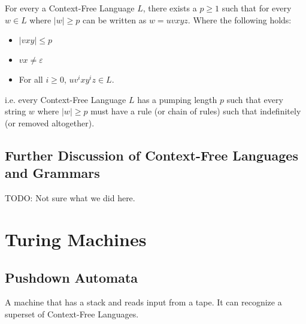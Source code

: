         For every a Context-Free Language $L$, there exists a $p \ge 1$ such
        that for every $w \in L$ where $|w| \ge p$ can be written as
        $w = uvxyz$.
        Where the following holds:
        \begin{itemize}
            \item $|vxy| \le p$
            \item $vx \ne \varepsilon$
            \item For all $i \ge 0$, $uv^ixy^iz \in L$.
        \end{itemize}
        i.e. every Context-Free Language $L$ has a pumping length $p$ such that
        every string $w$ where $|w| \ge p$ must have a rule (or chain of rules)
        such that
        indefinitely (or removed altogether).
    \section{Further Discussion of Context-Free Languages and Grammars}
        TODO: Not sure what we did here.

\chapter{Turing Machines}
    \section{Pushdown Automata}
        A machine that has a stack and reads input from a tape. It can recognize
        a superset of Context-Free Languages.

